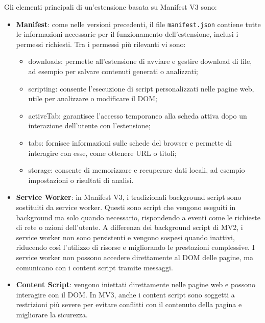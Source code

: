 \noindent Gli elementi principali di un’estensione basata su Manifest V3 sono:
\begin{itemize}
    \item \textbf{Manifest}: come nelle versioni precedenti, il file \texttt{manifest.json} contiene tutte le informazioni necessarie per il funzionamento dell’estensione, inclusi i permessi richiesti. 
    Tra i permessi più rilevanti vi sono: \begin{itemize}
        \item downloads: permette all’estensione di avviare e gestire download di file, ad esempio per salvare contenuti generati o analizzati;
        \item scripting: consente l’esecuzione di script personalizzati nelle pagine web, utile per analizzare o modificare il DOM;
        \item activeTab: garantisce l’accesso temporaneo alla scheda attiva dopo un interazione dell’utente con l’estensione;
        \item tabs: fornisce informazioni sulle schede del browser e permette di interagire con esse, come ottenere URL o titoli;
        \item storage: consente di memorizzare e recuperare dati locali, ad esempio impostazioni o risultati di analisi.
    \end{itemize}
    \item \textbf{Service Worker}: in Manifest V3, i tradizionali background script sono sostituiti da service worker. Questi sono script che vengono eseguiti in background ma solo quando necessario, rispondendo a eventi come le richieste di rete o azioni dell’utente. A differenza dei background script di MV2, i service worker non sono persistenti e vengono sospesi quando inattivi, riducendo così l’utilizzo di risorse e migliorando le prestazioni complessive. I service worker non possono accedere direttamente al DOM delle pagine, ma comunicano con i content script tramite messaggi.
    \item \textbf{Content Script}: vengono iniettati direttamente nelle pagine web e possono interagire con il DOM. In MV3, anche i content script sono soggetti a restrizioni più severe per evitare conflitti con il contenuto della pagina e migliorare la sicurezza.
\end{itemize}


